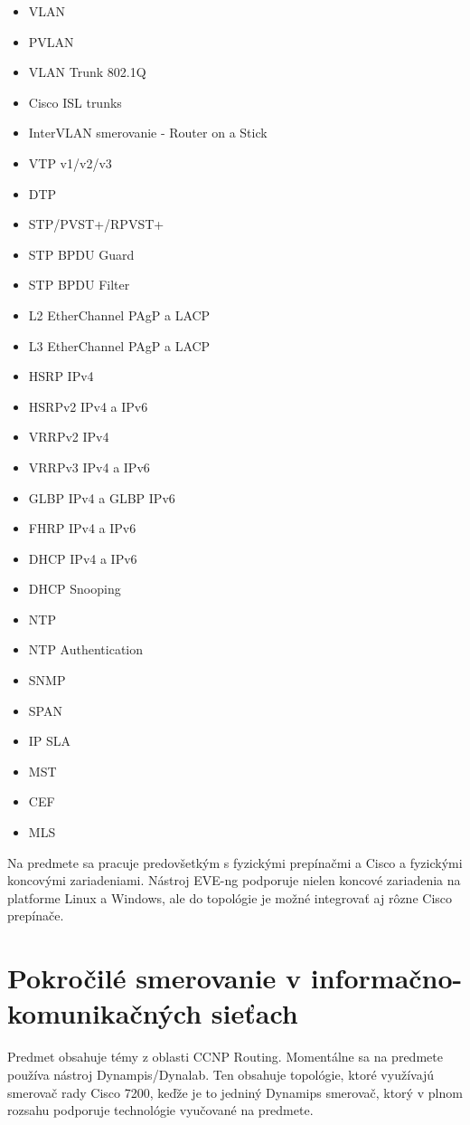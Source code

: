 \begin{itemize}
    \item VLAN
    \item PVLAN
    \item VLAN Trunk 802.1Q
    \item Cisco ISL trunks
    \item InterVLAN smerovanie - Router on a Stick
    \item VTP v1/v2/v3
    \item DTP
    \item STP/PVST+/RPVST+
    \item STP BPDU Guard
    \item STP BPDU Filter
    \item L2 EtherChannel PAgP a LACP
    \item L3 EtherChannel PAgP a LACP
    \item HSRP IPv4 
    \item HSRPv2 IPv4 a IPv6 
    \item VRRPv2 IPv4 
    \item VRRPv3 IPv4 a IPv6 
    \item GLBP IPv4 a GLBP IPv6 
    \item FHRP IPv4 a IPv6 
    \item DHCP IPv4 a IPv6 
    \item DHCP Snooping
    \item NTP
    \item NTP Authentication
    \item SNMP
    \item SPAN
    \item IP SLA
    \item MST
    \item CEF
    \item MLS
\end{itemize}

Na predmete sa pracuje predovšetkým s fyzickými prepínačmi a Cisco a fyzickými koncovými zariadeniami. Nástroj EVE-ng podporuje nielen koncové zariadenia na platforme Linux a Windows, ale do topológie je možné integrovať aj rôzne Cisco prepínače.





\section{Pokročilé smerovanie v informačno-komunikačných sieťach}

Predmet obsahuje témy z oblasti CCNP Routing. Momentálne sa na predmete používa nástroj Dynampis/Dynalab. Ten obsahuje topológie, ktoré využívajú smerovač rady Cisco 7200, keďže je to jedniný Dynamips smerovač, ktorý v plnom rozsahu podporuje technológie vyučované na predmete.

